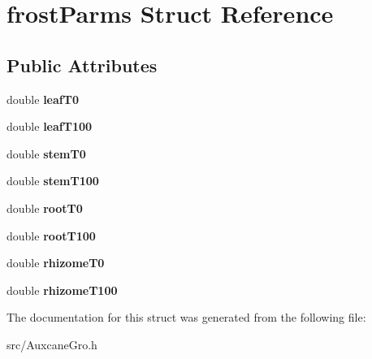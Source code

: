 \hypertarget{structfrost_parms}{\section{frost\-Parms Struct Reference}
\label{structfrost_parms}
}
\subsection*{Public Attributes}
\begin{DoxyCompactItemize}
\item 
\hypertarget{structfrost_parms_a0fa546bd7afada6093bc1118316432fa}{double {\bfseries leaf\-T0}}\label{structfrost_parms_a0fa546bd7afada6093bc1118316432fa}

\item 
\hypertarget{structfrost_parms_a85d10b33ac0d6fbce2b03d99b1b46c1d}{double {\bfseries leaf\-T100}}\label{structfrost_parms_a85d10b33ac0d6fbce2b03d99b1b46c1d}

\item 
\hypertarget{structfrost_parms_af485a9eb9c8d4cc39a5ce9b8fcdcc6a5}{double {\bfseries stem\-T0}}\label{structfrost_parms_af485a9eb9c8d4cc39a5ce9b8fcdcc6a5}

\item 
\hypertarget{structfrost_parms_a2e32827366e4d9070d0631201fdd92e9}{double {\bfseries stem\-T100}}\label{structfrost_parms_a2e32827366e4d9070d0631201fdd92e9}

\item 
\hypertarget{structfrost_parms_a34516140fa8e686c195d6a756a4214b8}{double {\bfseries root\-T0}}\label{structfrost_parms_a34516140fa8e686c195d6a756a4214b8}

\item 
\hypertarget{structfrost_parms_a4ef0bdb083dd1cd9d06cfc96f72d1015}{double {\bfseries root\-T100}}\label{structfrost_parms_a4ef0bdb083dd1cd9d06cfc96f72d1015}

\item 
\hypertarget{structfrost_parms_a02b34b6493c02561edb91f9197acd87b}{double {\bfseries rhizome\-T0}}\label{structfrost_parms_a02b34b6493c02561edb91f9197acd87b}

\item 
\hypertarget{structfrost_parms_a5e5069bc7b62eba2fe2bdd203737eb9c}{double {\bfseries rhizome\-T100}}\label{structfrost_parms_a5e5069bc7b62eba2fe2bdd203737eb9c}

\end{DoxyCompactItemize}


The documentation for this struct was generated from the following file\-:\begin{DoxyCompactItemize}
\item 
src/Auxcane\-Gro.\-h\end{DoxyCompactItemize}

